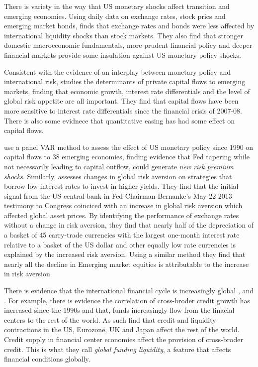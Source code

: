 \documentclass[12pt, a4paper, oneside]{article} %
\begin{document}
There is variety in the way that US monetary shocks affect transition and emerging economies.  Using daily data on exchange rates, stock prics and emerging market bonds, \citet{Tapering} finds that exchange rates and bonds were less affected by international liquidity shocks than stock markets.  They also find that stronger domestic macroeconomic fundamentals, more prudent financial policy and deeper financial markets provide some insulation against US monetary policy shocks. 

Consistent with the evidence of an interplay between monetary policy and international risk, \citet{Ahmed2014} studies the determinants of private capital flows to emerging markets, finding that economic growth, interest rate differentials and the level of global risk appetite are all important.  They find that capital flows have been more sensitive to interest rate differentials since the financial crisis of 2007-08. There is also some evidnece that quantitative easing has had some effect on capital flows. 

 \citet{IMFLatam} use a panel VAR method to assess the effect of US monetary policy since 1990 on capital flows to 38 emerging economies, finding evidence that Fed tapering while not necessarily leading to capital outflow, could generate \emph{new risk premium shocks}.   Similarly, \citet{NYFedtaper} assesses changes in global risk aversion on strategies that borrow low interest rates to invest in higher yields.  They find that the initial signal from the US central bank in Fed Chairman Bernanke's May 22 2013 testimony to Congress coinciced with an increase in global risk aversion which affected global asset prices. %
By identifying the performance of exchange rates without a change in risk aversion, they find that nearly half of the depreciation of a basket of 45 carry-trade currencies with the largest one-month interest rate relative to a basket of the US dollar and other equally low rate currencies is explained by the increased risk aversion. Using a similar method they find that nearly all the decline in Emerging market equities is attributable to the increase in risk aversion.

There is evidence that the international financial cycle is increasingly global \citet{Rey2013}, \citep{Obstfeld2013} and \citet{Bruno2013}.  %
For example, there is evidence the correlation of cross-broder credit growth has increased since the 1990s and that, funds increasingly flow from the finacial centers to the rest of the world. As such \citet{Cerutti2014} find that credit and liquidity contractions in  the US, Eurozone, UK and Japan affect the rest of the world. Credit supply in financial center economies affect the provision of cross-broder credit.  This is what they call \emph{global funding liquidity}, a feature that affects financial conditions globally. 
\end{document}
